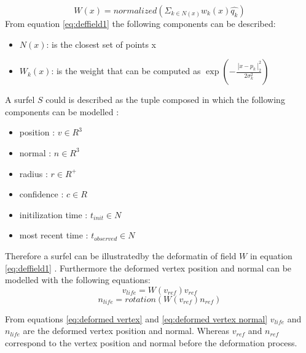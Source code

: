 \documentclass[12pt]{report}
\begin{document}
\begin{equation}  
  W(x)=normalized(\Sigma_{k \in N(x)} w_{k}(x) \hat{q_k})
  \label{eq:deffield1}
\end{equation}
From equation \ref{eq:deffield1} the following components can be described:
\begin{itemize}
  \item $N(x)$: is the closest set of points x
  \item $W_{k}(x)$:  is the weight that can be computed as $\exp{(-\frac{\ | {x-p_k} \ |^{2}_2 }{2\sigma^{2}_k})}$
\end{itemize}

A surfel $S$ could is described as the tuple composed in which the following components can be modelled :
\begin{itemize}
  \item position : $v \in R^3$ 
  \item  normal  : $n \in R^3$
  \item  radius : $r \in R^+$
  \item confidence : $c \in R$
  \item initilization time : $t_{init} \in N$
  \item most recent time : $t_{observed} \in N$ 
\end{itemize}
Therefore a surfel can be illustratedby the deformatin of field $W$ in equation \ref{eq:deffield1} \citep{SurfelWarp}.
Furthermore the deformed vertex position  and normal can be modelled with the following equations:
\begin{equation}
  v_{life}=W(v_{ref})v_{ref}
  \label{eq:deformed vertex}
\end{equation}
\begin{equation}
  n_{life}=rotation(W(v_{ref})n_{ref})
  \label{eq:deformed vertex normal}
\end{equation}

From equations \ref{eq:deformed vertex} and \ref{eq:deformed vertex normal} $v_{life}$ and $n_{life}$ are the deformed vertex position and normal.
Whereas $v_{ref}$ and $n_{ref}$ correspond to the vertex position and normal before the deformation process. 
\end{document}
